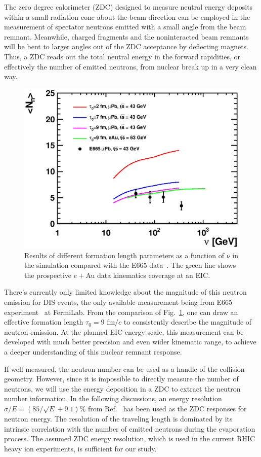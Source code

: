 The zero degree calorimeter (ZDC) designed to measure neutral energy deposits
within a small radiation cone about the beam direction can be employed in the
measurement of spectator neutrons emitted with a small angle from the beam
remnant. Meanwhile, charged fragments and the noninteracted
beam remnants will be bent to larger angles out of the ZDC acceptance by
deflecting magnets. Thus, a ZDC reads out the total
neutral energy in the forward rapidities, or effectively the number of
emitted neutrons, from nuclear break up in a very clean way.

\begin{figure}
\begin{center}
\includegraphics[width=0.7\columnwidth,keepaspectratio]{plots/chpt7/tau_comparison.eps}
\caption[comparison with E665]{Results of different formation length parameters as a function of $\nu$ in the simulation compared with the E665 data~\cite{Adams:1995nu}. The green line shows the prospective $e+$Au data kinematics coverage at an EIC.}
\label{fig:tauCompare}
\end{center}
\end{figure}

There's currently only limited knowledge about the magnitude of this neutron emission
for DIS events, the only available measurement being
from E665 experiment~\cite{Adams:1995nu} at FermiLab. From the comparison of
Fig.~\ref{fig:tauCompare}, one can draw an effective formation length $\tau_{0}=9$ fm$/c$
to consistently describe the magnitude of neutron emission. At the planned EIC
energy scale, this measurement can be developed with much better precision and
even wider kinematic range, to achieve a deeper understanding of this
nuclear remnant response.


If well measured, the neutron number can be used as a handle of the collision
geometry. However, since it is impossible to directly measure the number of
neutrons, we will use the energy deposition in a ZDC to extract the neutron
number information. In the following discussions, an energy resolution $\sigma/E
= (85/\sqrt{E} + 9.1)\%$ from Ref.~\cite{Adler:2000bd} has been used as the ZDC
responses for neutron energy. The resolution of the traveling length is
dominated by its intrinsic correlation with the number of emitted neutrons during
the evaporation process. The assumed ZDC energy resolution, which is used in the
current RHIC heavy ion experiments, is sufficient for our study.

